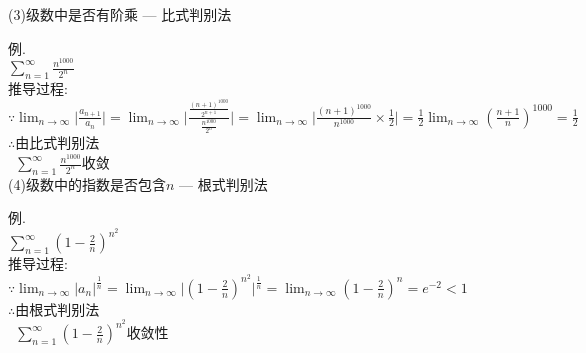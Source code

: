 (3)级数中是否有阶乘 --- 比式判别法\\
\begin{center}
\end{center}
例.\\
$\displaystyle\sum_{n=1}^{\infty}\frac{n^{1000}}{2^n}$\\[1ex]
推导过程:\\
$\because\displaystyle\lim_{n\to\infty}\Big|\frac{a_{n+1}}{a_n}\Big|=\lim_{n\to\infty}\Big|\frac{\frac{(n+1)^{1000}}{2^{n+1}}}{\frac{n^{1000}}{2^n}}\Big|=\lim_{n\to\infty}\Big|\frac{(n+1)^{1000}}{n^{1000}}\times\frac{1}{2}\Big|=\frac{1}{2}\lim_{n\to\infty}(\frac{n+1}{n})^{1000}=\frac{1}{2}$\\
$\therefore$由比式判别法\\
$\displaystyle\phantom{\therefore}\sum_{n=1}^{\infty}\frac{n^{1000}}{2^n}$收敛\\[2ex]

(4)级数中的指数是否包含$n$ --- 根式判别法\\
\begin{center}
\end{center}
例.\\
$\displaystyle\sum_{n=1}^{\infty}(1-\frac{2}{n})^{n^2}$\\[1ex]
推导过程:\\
$\because\displaystyle\lim_{n\to\infty}|a_n|^{\frac{1}{n}}=\lim_{n\to\infty}\Big|(1-\frac{2}{n})^{n^2}\Big|^{\frac{1}{n}}=\lim_{n\to\infty}(1-\frac{2}{n})^n=e^{-2}<1$\\
$\therefore$由根式判别法\\
$\phantom{\therefore}\displaystyle\sum_{n=1}^{\infty}(1-\frac{2}{n})^{n^2}$收敛性\\[2ex]

